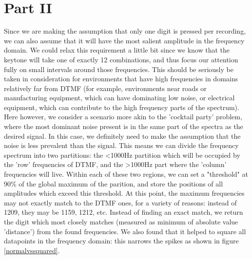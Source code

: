 \documentclass{article}
\begin{document}
\section{Part II}
Since we are making the assumption that only one digit is pressed per recording, we can also assume that it will have the most salient amplitude in the frequency domain.
We could relax this requirement a little bit since we know that the keytone will take one of exactly 12 combinations, and thus focus our attention fully on small intervals around those frequencies.
This should be seriously be taken in consideration for environments that have high frequencies in domains relatively far from DTMF (for example, environments near roads or manufacturing equipment, which can have dominating low noise, or electrical equipment, which can contribute to the high frequency parts of the spectrum).
Here however, we consider a scenario more akin to the 'cocktail party' problem, where the most dominant noise present is in the same part of the spectra as the desired signal.
In this case, we definitely need to make the assumption that the noise is less prevalent than the signal.
This means we can divide the frequency spectrum into two partitions: the <1000Hz partition which will be occupied by the 'row' frequencies of DTMF, and the >1000Hz part where the 'column' frequencies will live.
Within each of these two regions, we can set a "threshold" at 90\% of the global maximum of the parition, and store the positions of all amplitudes which exceed this threshold.
At this point, the maximum frequencies may not exactly match to the DTMF ones, for a variety of reasons: instead of 1209, they may be 1159, 1212, etc. Instead of finding an exact match, we return the digit which most closely matches (measured as minimum of absolute value 'distance') from the found frequencies.
We also found that it helped to square all datapoints in the frequency domain: this narrows the spikes as shown in figure \ref{normalvssquared}.
\end{document}
